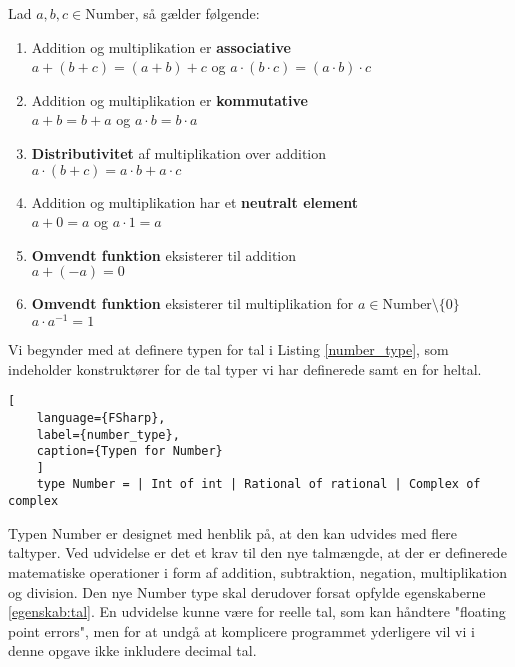 \vspace{0.5cm}
\begin{egenskab}\label{egenskab:tal}
  Lad $a, b, c \in \text{Number}$, så gælder følgende:
  \begin{enumerate}
    \item Addition og multiplikation er \textbf{associative} \\ $a + (b + c) = (a + b) + c$ og $a \cdot (b \cdot c) = (a \cdot b) \cdot c$
    \item Addition og multiplikation er \textbf{kommutative} \\ $a + b = b + a$ og $a \cdot b = b \cdot a$
    \item \textbf{Distributivitet} af multiplikation over addition \\ $a \cdot (b + c) = a \cdot b + a \cdot c$
    \item Addition og multiplikation har et \textbf{neutralt element} \\ $a + 0 = a$ og $a \cdot 1 = a$
    \item \textbf{Omvendt funktion} eksisterer til addition \\ $a + (-a) = 0$
    \item \textbf{Omvendt funktion} eksisterer til multiplikation for $a \in \text{Number} \setminus \{0\}$ \\ $a \cdot a^{-1} = 1$
\end{enumerate}
\end{egenskab}
  

Vi begynder med at definere typen for tal i Listing \ref{number_type}, som indeholder konstruktører for de tal typer vi har definerede samt en for heltal. 

\begin{lstlisting}[
    language={FSharp}, 
    label={number_type}, 
    caption={Typen for Number}
    ]
    type Number = | Int of int | Rational of rational | Complex of complex
\end{lstlisting}

Typen Number er designet med henblik på, at den kan udvides med flere taltyper. Ved udvidelse er det et krav til den nye talmængde, at der er definerede matematiske operationer i form af addition, subtraktion, negation, multiplikation og division. Den nye Number type skal derudover forsat opfylde egenskaberne \ref{egenskab:tal}. En udvidelse kunne være for reelle tal, som kan håndtere "floating point errors", men for at undgå at komplicere programmet yderligere vil vi i denne opgave ikke inkludere decimal tal.


